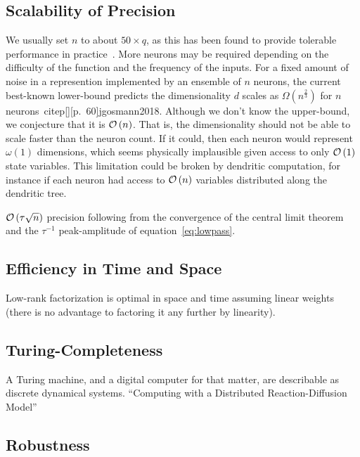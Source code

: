 \subsection{Scalability of Precision}
\label{sec:scalability}


We usually set $n$ to about $50 \times q$, as this has been found to provide tolerable performance in practice~\citep{braindrop2019}. 
More neurons may be required depending on the difficulty of the function and the frequency of the inputs.
For a fixed amount of noise in a represention implemented by an ensemble of $n$ neurons, the current best-known lower-bound predicts the dimensionality $d$ scales as $\Omega \left( n^{\frac{2}{3}} \right)$ for $n$ neurons~citep[][p.~60]{jgosmann2018}.
Although we don't know the upper-bound, we conjecture that it is $\mathcal{O}\left({n}\right)$.
That is, the dimensionality should not be able to scale faster than the neuron count.
If it could, then each neuron would represent $\omega(1)$ dimensions, which seems physically implausible given access to only $\mathcal{O}\left({1}\right)$ state variables.
This limitation could be broken by dendritic computation, for instance if each neuron had access to $\mathcal{O}\left({n}\right)$ variables distributed along the dendritic tree.

$\mathcal{O}\left({ \tau \sqrt{n} }\right)$ precision following from the convergence of the central limit theorem~\citep[CLT;][]{berry1941accuracy, esseen1942liapunov} and the $\tau^{-1}$ peak-amplitude of equation~\ref{eq:lowpass}.

\subsection{Efficiency in Time and Space}

Low-rank factorization is optimal in space and time assuming linear weights (there is no advantage to factoring it any further by linearity).

\subsection{Turing-Completeness}
\label{sec:nef-turing}

A Turing machine, and a digital computer for that matter, are describable as discrete dynamical systems.
``Computing with a Distributed Reaction-Diffusion Model''


\subsection{Robustness}
\label{sec:nef-robustness}

